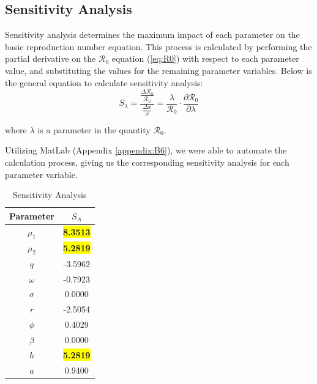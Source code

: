 \documentclass[12pt]{article}
\begin{document}
\subsection{Sensitivity Analysis}
Sensitivity analysis determines the maximum impact of each parameter on the basic reproduction number equation. This process is calculated by performing the partial derivative on the $\mathscr{R}_0$ equation (\ref{eq:R0}) with respect to each parameter value, and substituting the values for the remaining parameter variables. Below is the general equation to calculate sensitivity analysis: \\
\begin{equation*}
        S_{\lambda} = \frac{\frac{\Delta \mathscr{R}_{0}}{\mathscr{R}_{0}}}{\frac{\Delta x}{x}} = \frac{\lambda}{\mathscr{R}_{0}} \cdot \frac{\partial \mathscr{R}_{0}}{\partial \lambda}
        \label{eq:sens_analysis}
\end{equation*}
\begin{center}
    where $\lambda$ is a parameter in the quantity $\mathscr{R}_{0}$.
\end{center}

Utilizing MatLab (Appendix \ref{appendix:B6}), we were able to automate the calculation process, giving us the corresponding sensitivity analysis for each parameter variable. 
\begin{table}[H]
        \centering
        \begin{tabular}{|c|c|}
            \hline
            Parameter & $S_{A}$ \\
            \hline
            \hline
            $\mu_{1}$ & \colorbox{yellow}{\textbf{8.3513}}\\
            \hline
            $\mu_{2}$ & \colorbox{yellow}{\textbf{5.2819}}\\
            \hline
            $q$ & -3.5962\\
            \hline
            $\omega$ & -0.7923\\
            \hline
            $\sigma$ & 0.0000\\
            \hline
            $r$ & -2.5054\\
            \hline
            $\phi$ & 0.4029\\
            \hline
            $\beta$ & 0.0000\\
            \hline
            $h$ & \colorbox{yellow}{\textbf{5.2819}}\\
            \hline
            $a$ & 0.9400\\
            \hline
        \end{tabular}
        \caption{Sensitivity Analysis}
        \label{tab:sens_analysis}
\end{table}
    
\end{document}
